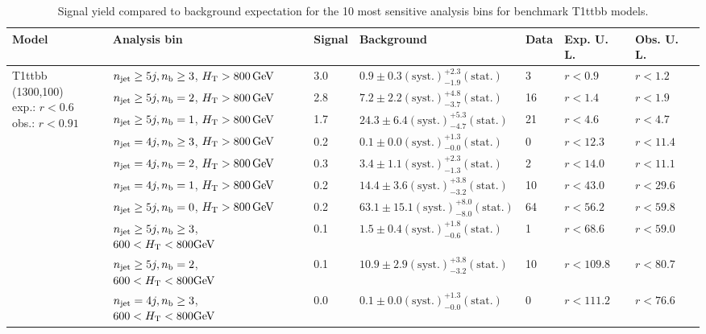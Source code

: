 \begin{table}[h!] 
  \scriptsize
  \caption{ 
Signal yield compared to background expectation for the 10 most sensitive analysis bins 
for benchmark T1ttbb models.
  \label{tab:sigBenchmarksYields_T1ttbb}}
  \centering 
  \begin{tabular}{ lllllll } 
    \hline 
    \hline 
    Model & Analysis bin & Signal & Background & Data & Exp. U. L. & Obs. U. L. \\ \hline
\multirow{10}{*}{\parbox[t]{2cm}{T1ttbb (1300,100)\\exp.: $r<0.6$\\obs.: $r<0.91$}}
 & $n_{\mathrm{jet}} \geq5j,n_{\text{b}} \geq3$, $\mbox{$H_\text{T}$} > 800 \, \mathrm{GeV}$ & 3.0 & $0.9 \pm 0.3 \mathrm{(syst.)} ^{+2.3}_{-1.9} \mathrm{(stat.)}$ & 3 & $r < 0.9$ & $r < 1.2$\\ 
 & $n_{\mathrm{jet}} \geq5j,n_{\text{b}} =2$, $\mbox{$H_\text{T}$} > 800 \, \mathrm{GeV}$ & 2.8 & $7.2 \pm 2.2 \mathrm{(syst.)} ^{+4.8}_{-3.7} \mathrm{(stat.)}$ & 16 & $r < 1.4$ & $r < 1.9$\\ 
 & $n_{\mathrm{jet}} \geq5j,n_{\text{b}} =1$, $\mbox{$H_\text{T}$} > 800 \, \mathrm{GeV}$ & 1.7 & $24.3 \pm 6.4 \mathrm{(syst.)} ^{+5.3}_{-4.7} \mathrm{(stat.)}$ & 21 & $r < 4.6$ & $r < 4.7$\\ 
 & $n_{\mathrm{jet}} =4j,n_{\text{b}} \geq3$, $\mbox{$H_\text{T}$} > 800 \, \mathrm{GeV}$ & 0.2 & $0.1 \pm 0.0 \mathrm{(syst.)} ^{+1.3}_{-0.0} \mathrm{(stat.)}$ & 0 & $r < 12.3$ & $r < 11.4$\\ 
 & $n_{\mathrm{jet}} =4j,n_{\text{b}} =2$, $\mbox{$H_\text{T}$} > 800 \, \mathrm{GeV}$ & 0.3 & $3.4 \pm 1.1 \mathrm{(syst.)} ^{+2.3}_{-1.3} \mathrm{(stat.)}$ & 2 & $r < 14.0$ & $r < 11.1$\\ 
 & $n_{\mathrm{jet}} =4j,n_{\text{b}} =1$, $\mbox{$H_\text{T}$} > 800 \, \mathrm{GeV}$ & 0.2 & $14.4 \pm 3.6 \mathrm{(syst.)} ^{+3.8}_{-3.2} \mathrm{(stat.)}$ & 10 & $r < 43.0$ & $r < 29.6$\\ 
 & $n_{\mathrm{jet}} \geq5j,n_{\text{b}} =0$, $\mbox{$H_\text{T}$} > 800 \, \mathrm{GeV}$ & 0.2 & $63.1 \pm 15.1 \mathrm{(syst.)} ^{+8.0}_{-8.0} \mathrm{(stat.)}$ & 64 & $r < 56.2$ & $r < 59.8$\\ 
 & $n_{\mathrm{jet}} \geq5j,n_{\text{b}} \geq3$, $600 < \mbox{$H_\text{T}$} < 800 \mathrm{GeV}$ & 0.1 & $1.5 \pm 0.4 \mathrm{(syst.)} ^{+1.8}_{-0.6} \mathrm{(stat.)}$ & 1 & $r < 68.6$ & $r < 59.0$\\ 
 & $n_{\mathrm{jet}} \geq5j,n_{\text{b}} =2$, $600 < \mbox{$H_\text{T}$} < 800 \mathrm{GeV}$ & 0.1 & $10.9 \pm 2.9 \mathrm{(syst.)} ^{+3.8}_{-3.2} \mathrm{(stat.)}$ & 10 & $r < 109.8$ & $r < 80.7$\\ 
 & $n_{\mathrm{jet}} =4j,n_{\text{b}} \geq3$, $600 < \mbox{$H_\text{T}$} < 800 \mathrm{GeV}$ & 0.0 & $0.1 \pm 0.0 \mathrm{(syst.)} ^{+1.3}_{-0.0} \mathrm{(stat.)}$ & 0 & $r < 111.2$ & $r < 76.6$\\ \hline

\end{tabular}
\end{table}
